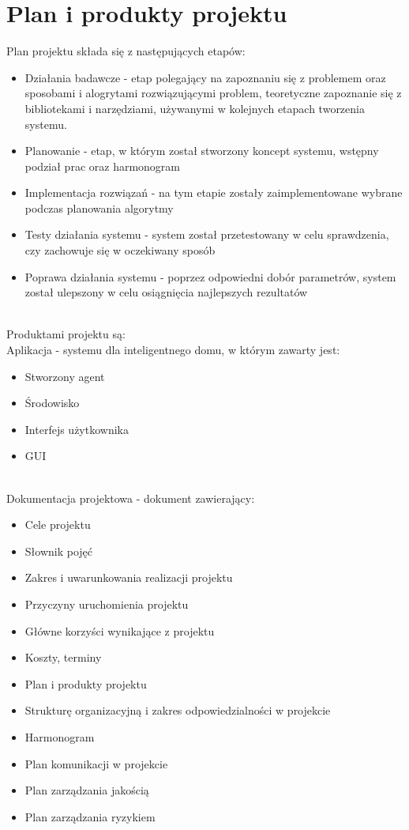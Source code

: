 \documentclass{article}
\begin{document}
\section{Plan i produkty projektu}
Plan projektu składa się z następujących etapów:
\begin{itemize}
\item Działania badawcze - etap polegający na zapoznaniu się z problemem oraz sposobami i alogrytami rozwiązującymi problem, teoretyczne zapoznanie się z bibliotekami i narzędziami, używanymi w kolejnych etapach tworzenia systemu.
\item Planowanie - etap, w którym został stworzony koncept systemu, wstępny podział prac oraz harmonogram
\item Implementacja rozwiązań - na tym etapie zostały zaimplementowane wybrane podczas planowania algorytmy
\item Testy działania systemu - system został przetestowany w celu sprawdzenia, czy zachowuje się w oczekiwany sposób
\item Poprawa działania systemu - poprzez odpowiedni dobór parametrów, system został ulepszony w celu osiągnięcia najlepszych rezultatów
\end{itemize} \mbox{}\\
Produktami projektu są: \mbox{}\\
Aplikacja - systemu dla inteligentnego domu, w którym zawarty jest:
\begin{itemize}
\item Stworzony agent
\item Środowisko
\item Interfejs użytkownika
\item GUI
\end{itemize} \mbox{}\\
Dokumentacja projektowa - dokument zawierający:
\begin{itemize}
\item Cele projektu
\item Słownik pojęć
\item Zakres i uwarunkowania realizacji projektu
\item Przyczyny uruchomienia projektu
\item Główne korzyści wynikające z projektu
\item Koszty, terminy
\item Plan i produkty projektu
\item Strukturę organizacyjną i zakres odpowiedzialności w projekcie
\item Harmonogram
\item Plan komunikacji w projekcie
\item Plan zarządzania jakością
\item Plan zarządzania ryzykiem
\end{itemize} \mbox{}\\
\end{document}

